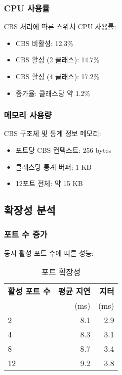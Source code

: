 \documentclass[twocolumn,10pt]{article}
\begin{document}
\subsubsection{CPU 사용률}

CBS 처리에 따른 스위치 CPU 사용률:

\begin{itemize}
    \item CBS 비활성: 12.3\%
    \item CBS 활성 (2 클래스): 14.7\%
    \item CBS 활성 (4 클래스): 17.2\%
    \item 증가율: 클래스당 약 1.2\%
\end{itemize}

\subsubsection{메모리 사용량}

CBS 구조체 및 통계 정보 메모리:

\begin{itemize}
    \item 포트당 CBS 컨텍스트: 256 bytes
    \item 클래스당 통계 버퍼: 1 KB
    \item 12포트 전체: 약 15 KB
\end{itemize}

\subsection{확장성 분석}

\subsubsection{포트 수 증가}

동시 활성 포트 수에 따른 성능:

\begin{table}[h]
\centering
\caption{포트 확장성}
\label{tab:port_scalability}
\begin{tabular}{lrr}
\toprule
\textbf{활성 포트 수} & \textbf{평균 지연} & \textbf{지터} \\
 & (ms) & (ms) \\
\midrule
2 & 8.1 & 2.9 \\
4 & 8.3 & 3.1 \\
8 & 8.7 & 3.4 \\
12 & 9.2 & 3.8 \\
\bottomrule
\end{tabular}
\end{table}
\end{document}

